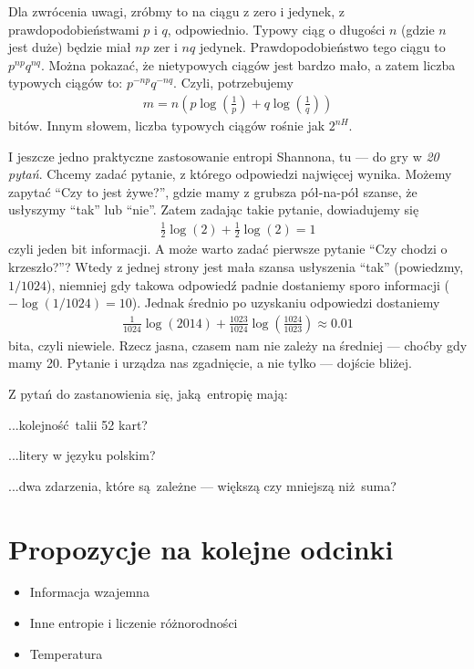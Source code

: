 \documentclass[10pt,a4paper]{article}
\begin{document}
Dla zwrócenia uwagi, zróbmy to na ciągu z zero i jedynek, z prawdopodobieństwami $p$ i $q$, odpowiednio.
Typowy ciąg o długości $n$ (gdzie $n$ jest duże) będzie miał $n p$ zer i $n q$ jedynek.
Prawdopodobieństwo tego ciągu to $p^{n p}q^{n q}$.
Można pokazać, że nietypowych ciągów jest bardzo mało, a zatem liczba typowych ciągów to:
$p^{-n p}q^{-n q}$.
Czyli, potrzebujemy
%
\begin{align}
    m=n \left( p \log(\tfrac{1}{p}) + q \log(\tfrac{1}{q}) \right)
\end{align}
%
bitów.
Innym słowem, liczba typowych ciągów rośnie jak $2^{n H}$.


I jeszcze jedno praktyczne zastosowanie entropi Shannona, tu --- do gry w \emph{20 pytań}.
Chcemy zadać pytanie, z którego odpowiedzi najwięcej wynika.
Możemy zapytać ``Czy to jest żywe?'', gdzie mamy z grubsza pół-na-pół szanse, że usłyszymy ``tak'' lub ``nie''.
Zatem zadając takie pytanie, dowiadujemy się
%
\begin{align}
    \tfrac{1}{2} \log(2) + \tfrac{1}{2} \log(2)  = 1
\end{align}
%
czyli jeden bit informacji. 
A może warto zadać pierwsze pytanie ``Czy chodzi o krzeszło?''?
Wtedy z jednej strony jest mała szansa usłyszenia ``tak'' (powiedzmy, $1/1024$),
niemniej gdy takowa odpowiedź padnie dostaniemy sporo informacji  ($-\log(1/1024)=10$).
Jednak średnio po uzyskaniu odpowiedzi dostaniemy
%
\begin{align}
    \tfrac{1}{1024} \log(2014) + \tfrac{1023}{1024} \log(\tfrac{1024}{1023}) \approx 0.01
\end{align}
%
bita, czyli niewiele.
Rzecz jasna, czasem nam nie zależy na średniej --- choćby gdy mamy 20.
Pytanie i urządza nas zgadnięcie, a nie tylko --- dojście bliżej.

Z pytań do zastanowienia się, jaką entropię mają:
\begin{item}
    \item ...kolejność talii 52 kart?
    \item ...litery w języku polskim?
    \item ...dwa zdarzenia, które są zależne --- większą czy mniejszą niż suma?
\end{item}


\section{Propozycje na kolejne odcinki}

\begin{itemize}
    \item Informacja wzajemna
    \item Inne entropie i liczenie różnorodności
    \item Temperatura
\end{itemize}
\end{document}
